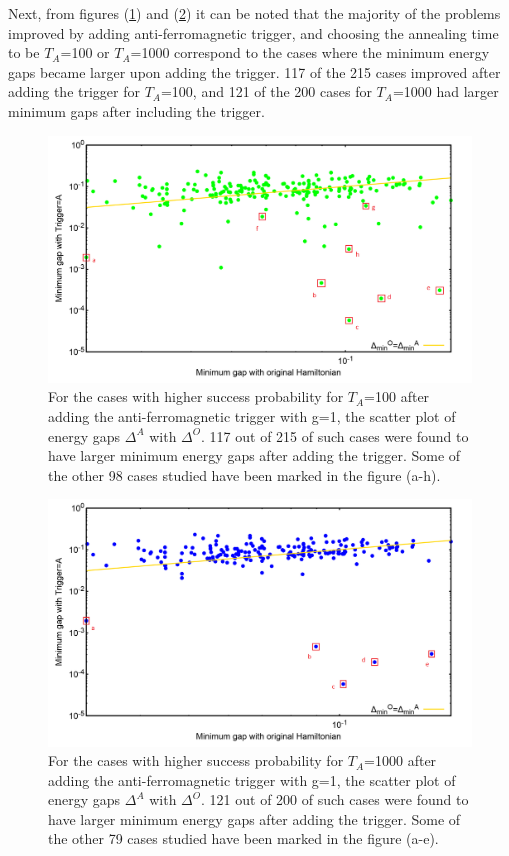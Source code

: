 \documentclass[../main.tex]{subfiles}
\begin{document}
Next, from figures (\ref{fig:a26}) and (\ref{fig:a27}) it can be noted that the majority of the problems improved by adding anti-ferromagnetic trigger, and choosing the annealing time to be $T_A$=100 or $T_A$=1000 correspond to the cases where the minimum energy gaps became larger upon adding the trigger. 117 of the   215 cases improved after adding the trigger for $T_A$=100, and 121 of the 200 cases for $T_A$=1000 had larger minimum gaps after including the trigger.
\begin{figure}[H]
\centering 
\includegraphics[scale=0.43]{selected_T100_g1.png}
\caption{For the cases with higher success probability for $T_A$=100 after adding the anti-ferromagnetic trigger with g=1, the scatter plot of energy gaps $\Delta^A $ with $\Delta^O$. 117 out of 215 of such cases were found to have larger minimum energy gaps after adding the trigger. Some of the other 98 cases studied have been marked in the figure (a-h).}
\label{fig:a26}
\end{figure}
\begin{figure}[H]
\centering 
\includegraphics[scale=0.43]{selected_T1000_g1.png}
\caption{For the cases with higher success probability for $T_A$=1000 after adding the anti-ferromagnetic trigger with g=1, the scatter plot of energy gaps $\Delta^A $ with $\Delta^O$. 121 out of 200 of such cases were found to have larger minimum energy gaps after adding the trigger. Some of the other 79 cases studied have been marked in the figure (a-e).}
\label{fig:a27}
\end{figure}
\end{document}
